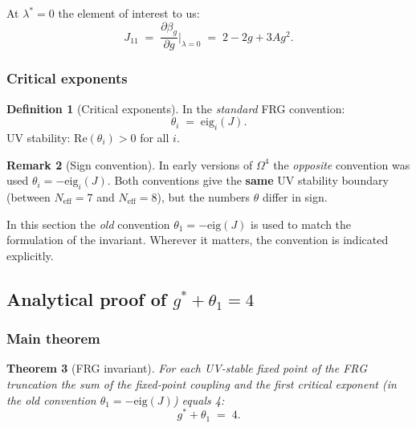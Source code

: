\documentclass[11pt,a4paper]{article}
\newcommand{\Om}{\ensuremath{\Omega^4}}
\newtheorem{theorem}{Theorem}[section]
\theoremstyle{definition}
\newtheorem{definition}[theorem]{Definition}
\newtheorem{remark}[theorem]{Remark}
\begin{document}
\medskip\noindent
At $\lambda^* = 0$ the element of interest to us:
\begin{equation}
    \boxed{
    J_{11} \;=\; \frac{\partial \beta_g}{\partial g}\bigg|_{\lambda = 0}
    \;=\; 2 - 2g + 3A g^2.
    }
    \label{eq:J11}
\end{equation}

\subsubsection{Critical exponents}

\begin{definition}[Critical exponents]
\label{def:critical-exponents}
In the \emph{standard} FRG convention:
\begin{equation}
    \theta_i \;=\; \mathrm{eig}_i(J).
    \label{eq:theta-std}
\end{equation}
UV stability: $\mathrm{Re}(\theta_i) > 0$ for all $i$.
\end{definition}

\begin{remark}[Sign convention]
\label{rem:theta-convention}
In early versions of $\Om$ the \emph{opposite} convention was used
$\theta_i = -\mathrm{eig}_i(J)$. Both conventions give the \textbf{same}
UV stability boundary (between $N_{\text{eff}} = 7$
and $N_{\text{eff}} = 8$), but the numbers $\theta$ differ in sign.

In this section the \emph{old} convention
$\theta_1 = -\mathrm{eig}(J)$ is used to match the formulation
of the invariant. Wherever it matters, the convention is indicated explicitly.
\end{remark}

\subsection{Analytical proof of \texorpdfstring{$g^* + \theta_1 = 4$}{g\textasciicircum * + \_1 = 4}}
\label{subsec:frg-proof}

\subsubsection{Main theorem}

\begin{theorem}[FRG invariant]
\label{thm:invariant}
For each UV-stable fixed point of the FRG truncation
the sum of the fixed-point coupling and the first critical exponent
(in the \emph{old} convention $\theta_1 = -\mathrm{eig}(J)$) equals 4:
\begin{equation}
    \boxed{
    g^* + \theta_1 \;=\; 4.
    }
    \label{eq:invariant-main}
\end{equation}
\end{theorem}
\end{document}
